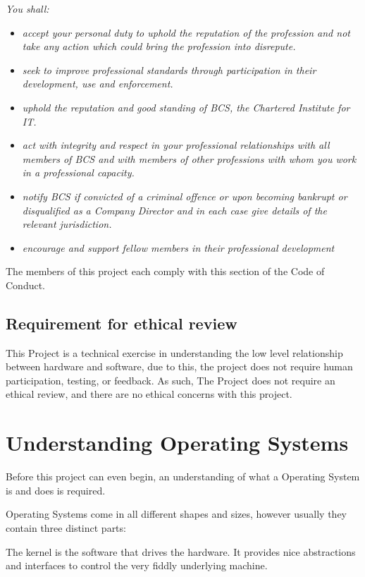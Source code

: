 \documentclass[a4paper]{report}
\begin{document}
\textit{You shall:}
\begin{itemize}
\item \textit{accept your personal duty to uphold the reputation of the profession and not take any action which could bring the profession into disrepute.}
\item \textit{seek to improve professional standards through participation in their development, use and enforcement.}
\item \textit{uphold the reputation and good standing of BCS, the Chartered Institute for IT.}
\item \textit{act with integrity and respect in your professional relationships with all members of BCS and with members of other professions with whom you work in a professional capacity.}
\item \textit{notify BCS if convicted of a criminal offence or upon becoming bankrupt or disqualified as a Company Director and in each case give details of the relevant jurisdiction.}
\item \textit{encourage and support fellow members in their professional development}
\end{itemize}

The members of this project each comply with this section of the Code of Conduct.



\section{Requirement for ethical review}

This Project is a technical exercise in understanding the low level relationship between hardware and software, due to this, the project does not require human participation, testing, or feedback. As such, The Project does not require an ethical review, and there are no ethical concerns with this project.

\clearpage
\chapter{Understanding Operating Systems}


Before this project can even begin, an understanding of what a Operating System is and does is required.

Operating Systems come in all different shapes and sizes, however usually they contain three distinct parts:

The kernel is the software that drives the hardware. It provides nice abstractions and interfaces to control the very fiddly underlying machine.
\end{document}
